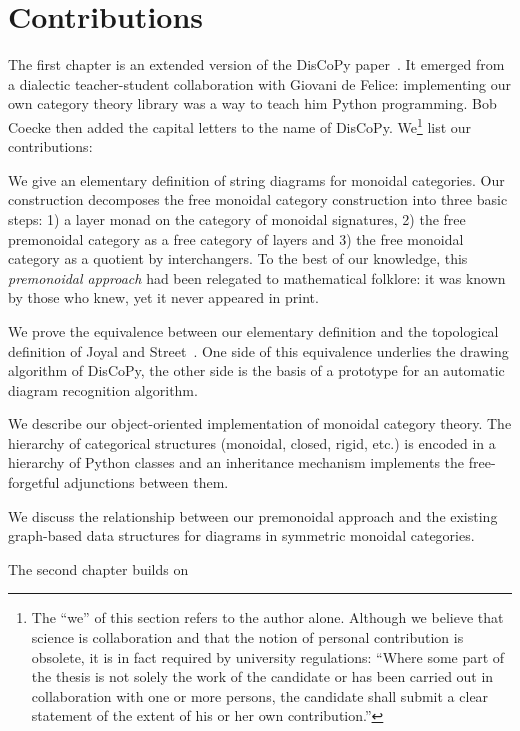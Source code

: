 
\section*{Contributions}

The first chapter is an extended version of the DisCoPy paper~\cite{FeliceEtAl20a}.
It emerged from a dialectic teacher-student collaboration with Giovani de Felice: implementing our own category theory library was a way to teach him Python programming.
Bob Coecke then added the capital letters to the name of DisCoPy.
We\footnote
{The ``we'' of this section refers to the author  alone.
Although we believe that science is collaboration and that the notion of personal contribution is obsolete, it is in fact required by university regulations: ``Where some part of the thesis is not solely the work of the candidate or has been carried out in collaboration with one or more persons, the candidate shall submit a clear statement of the extent of his or her own contribution.''}
list our contributions:
\begin{itemize
}
\item We give an elementary definition of string diagrams for monoidal categories.
Our construction decomposes the free monoidal category construction into three basic steps: 1) a layer monad on the category of monoidal signatures, 2) the free premonoidal category as a free category of layers and 3) the free monoidal category as a quotient by interchangers.
To the best of our knowledge, this \emph{premonoidal approach} had been relegated to mathematical folklore: it was known by those who knew, yet it never appeared in print.
\item We prove the equivalence between our elementary definition and the topological definition of Joyal and Street~\cite{JoyalStreet88}.
One side of this equivalence underlies the drawing algorithm of DisCoPy, the other side is the basis of a prototype for an automatic diagram recognition algorithm.
\item We describe our object-oriented implementation of monoidal category theory.
The hierarchy of categorical structures (monoidal, closed, rigid, etc.) is encoded in a hierarchy of Python classes and an inheritance mechanism implements the free-forgetful adjunctions between them.
\item We discuss the relationship between our premonoidal approach and the existing graph-based data structures for diagrams in symmetric monoidal categories.
\end{itemize
}
The second chapter builds on \cite{MeichanetzidisEtAl20,CoeckeEtAl20,MeichanetzidisEtAl20a}

